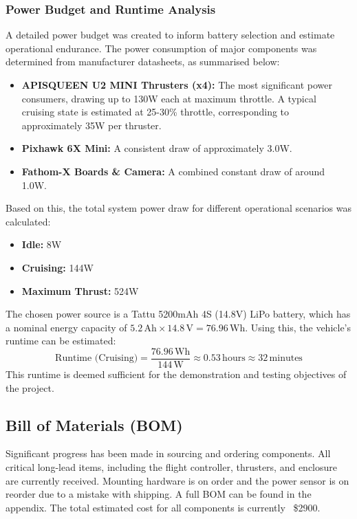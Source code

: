 \documentclass[11pt, a4paper]{article}
\begin{document}
\subsubsection{Power Budget and Runtime Analysis}
A detailed power budget was created to inform battery selection and estimate operational endurance. The power consumption of major components was determined from manufacturer datasheets, as summarised below:
\begin{itemize}
    \item \textbf{APISQUEEN U2 MINI Thrusters (x4):} The most significant power consumers, drawing up to 130W each at maximum throttle. A typical cruising state is estimated at 25-30\% throttle, corresponding to approximately 35W per thruster.
    \item \textbf{Pixhawk 6X Mini:} A consistent draw of approximately 3.0W.
    \item \textbf{Fathom-X Boards \& Camera:} A combined constant draw of around 1.0W.
\end{itemize}

Based on this, the total system power draw for different operational scenarios was calculated:
\begin{itemize}
    \item \textbf{Idle:} 8W
    \item \textbf{Cruising:} 144W
    \item \textbf{Maximum Thrust:} 524W
\end{itemize}

The chosen power source is a Tattu 5200mAh 4S (14.8V) LiPo battery, which has a nominal energy capacity of $5.2 \, \text{Ah} \times 14.8 \, \text{V} = 76.96 \, \text{Wh}$. Using this, the vehicle's runtime can be estimated:
$$ \text{Runtime (Cruising)} = \frac{76.96 \, \text{Wh}}{144 \, \text{W}} \approx 0.53 \, \text{hours} \approx 32 \, \text{minutes} $$
This runtime is deemed sufficient for the demonstration and testing objectives of the project.


\subsection{Bill of Materials (BOM)}
Significant progress has been made in sourcing and ordering components. All critical long-lead items, including the flight controller, thrusters, and enclosure are currently received. Mounting hardware is on order and the power sensor is on reorder due to a mistake with shipping. A full BOM can be found in the appendix. The total estimated cost for all components is currently ~\$2900.
\end{document}
